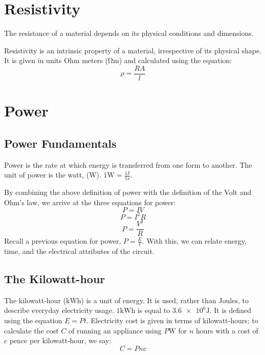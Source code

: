 \documentclass[11pt]{article}
\begin{document}
\section{Resistivity}

The resistance of a material depends on its physical conditions and dimensions.

\begin{define}
	Resistivity is an intrinsic property of a material, irrespective of its physical shape. It is given in units Ohm meters ($\si{\ohm\meter}$) and calculated using the equation:
	\[\rho = \frac{RA}{l}\]
\end{define}

\section{Power}

\subsection{Power Fundamentals}

\begin{define}
	Power is the rate at which energy is transferred from one form to another. The unit of power is the watt, ($\si{\watt}$). $1\si{\watt}=\frac{1\si{\joule}}{1\si{s}}$.
\end{define}

By combining the above definition of power with the definition of the Volt and Ohm's law, we arrive at the three equations for power:
\[P=IV\]
\[P=I^2R\]
\[P=\frac{V^2}{R}\]
Recall a previous equation for power, $P=\frac{E}{t}$. With this, we can relate energy, time, and the electrical attributes of the circuit.

\subsection{The Kilowatt-hour}

The kilowatt-hour ($\si{\kilo\watt\hour}$) is a unit of energy. It is used, rather than Joules, to describe everyday electricity usage. $1\si{\kilo\watt\hour}$ is equal to $\num{3.6e6}\si{\joule}$. It is defined using the equation $E=Pt$. Electricity cost is given in terms of kilowatt-hours; to calculate the cost $C$ of running an appliance using $P\si{\watt}$ for $n$ hours with a cost of $c$ pence per kilowatt-hour, we say:
\[C=Pnc\]
\end{document}
